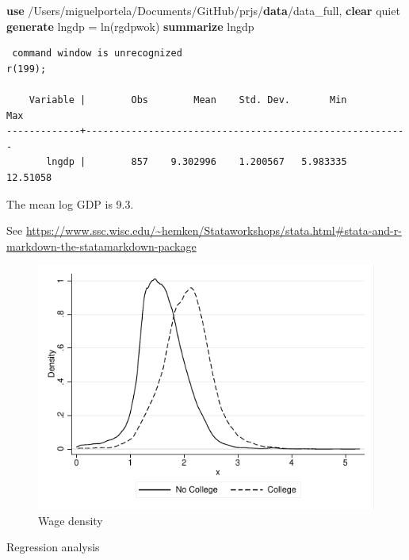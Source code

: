 \documentclass[
  12pt,
]{article}
\newenvironment{Shaded}{\begin{snugshade}}{\end{snugshade}}
\newcommand{\FunctionTok}[1]{\textcolor[rgb]{0.00,0.00,0.00}{#1}}
\newcommand{\KeywordTok}[1]{\textcolor[rgb]{0.13,0.29,0.53}{\textbf{#1}}}
\newcommand{\NormalTok}[1]{#1}
\begin{document}
\begin{Shaded}
\begin{Highlighting}[]
\KeywordTok{use}\NormalTok{ /Users/miguelportela/Documents/GitHub/prjs/}\KeywordTok{data}\NormalTok{/data_full, }\KeywordTok{clear}
\NormalTok{        quiet }\KeywordTok{generate}\NormalTok{ lngdp = }\FunctionTok{ln}\NormalTok{(rgdpwok)}
      \KeywordTok{summarize}\NormalTok{ lngdp}
\end{Highlighting}
\end{Shaded}

\begin{verbatim}
 command window is unrecognized
r(199);

    Variable |        Obs        Mean    Std. Dev.       Min        Max
-------------+---------------------------------------------------------
       lngdp |        857    9.302996    1.200567   5.983335   12.51058
\end{verbatim}

\vspace{0.3cm}

The mean log GDP is 9.3.

\vspace{0.3cm}

See \url{https://www.ssc.wisc.edu/~hemken/Stataworkshops/stata.html\#stata-and-r-markdown-the-statamarkdown-package}

\begin{figure}
\centering
\includegraphics{logs/density.pdf}
\caption{Wage density}
\end{figure}

\begin{table}[ht]
\caption{Regression analysis}
\label{tab:stata}
  
\end{table}
\end{document}
